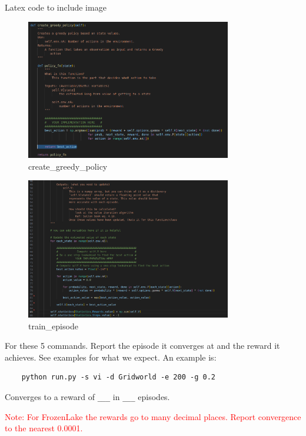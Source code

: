 \documentclass[a4paper]{article}
\theoremstyle{definition}
\newcommand{\red}[1]{\textcolor{red}{#1}}
\begin{document}
Latex code to include image
\begin{figure}[H]
    \centering
    \includegraphics[width=0.8\textwidth]{images/2.greedy_policy.png}
    \caption{create\_greedy\_policy}
    \label{fig:greedy_policy}
\end{figure}

\begin{figure}[H]
    \centering
    \includegraphics[width=0.8\textwidth]{images/2.train_episode.png}
    \caption{train\_episode}
    \label{fig:train_episode}
\end{figure}

\vspace{5mm}
For these 5 commands. Report the episode it converges at and the reward it achieves. See examples for what we expect. An example is: \begin{verbatim}
    python run.py -s vi -d Gridworld -e 200 -g 0.2
\end{verbatim}
Converges to a reward of \verb|___| in \verb|___| episodes.

\red{Note: For FrozenLake the rewards go to many decimal places. Report convergence to the nearest 0.0001.}
\end{document}
